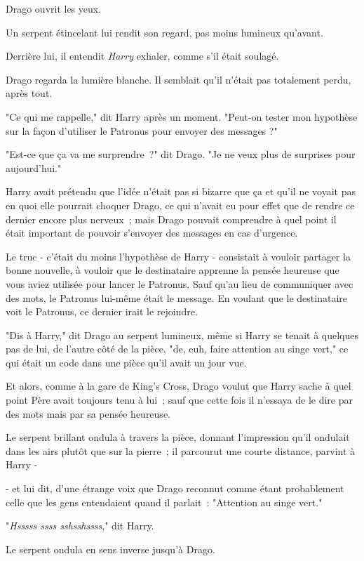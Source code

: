Drago ouvrit les yeux.

Un serpent étincelant lui rendit son regard, pas moins lumineux qu'avant.

Derrière lui, il entendit \emph{Harry} exhaler, comme s'il était soulagé.

Drago regarda la lumière blanche. Il semblait qu'il n'était pas totalement perdu, après tout.

"Ce qui me rappelle," dit Harry après un moment. "Peut-on tester mon hypothèse sur la façon d'utiliser le Patronus pour envoyer des messages ?"

"Est-ce que ça va me surprendre~?" dit Drago. "Je ne veux plus de surprises pour aujourd'hui."

\later

Harry avait prétendu que l'idée n'était pas si bizarre que ça et qu'il ne voyait pas en quoi elle pourrait choquer Drago, ce qui n'avait eu pour effet que de rendre ce dernier encore plus nerveux~; mais Drago pouvait comprendre à quel point il était important de pouvoir s'envoyer des messages en cas d'urgence.

Le truc - c'était du moins l'hypothèse de Harry - consistait à vouloir partager la bonne nouvelle, à vouloir que le destinataire apprenne la pensée heureuse que vous aviez utilisée pour lancer le Patronus. Sauf qu'au lieu de communiquer avec des mots, le Patronus lui-même était le message. En voulant que le destinataire voit le Patronus, ce dernier irait le rejoindre.

"Dis à Harry," dit Drago au serpent lumineux, même si Harry se tenait à quelques pas de lui, de l'autre côté de la pièce, "de, euh, faire attention au singe vert," ce qui était un code dans une pièce qu'il avait un jour vue.

Et alors, comme à la gare de King's Cross, Drago voulut que Harry sache à quel point Père avait toujours tenu à lui~; sauf que cette fois il n'essaya de le dire par des mots mais par sa pensée heureuse.

Le serpent brillant ondula à travers la pièce, donnant l'impression qu'il ondulait dans les airs plutôt que sur la pierre~; il parcourut une courte distance, parvint à Harry -

- et lui dit, d'une étrange voix que Drago reconnut comme étant probablement celle que les gens entendaient quand il parlait~: "Attention au singe vert."

"\emph{Hsssss ssss sshsshssss}," dit Harry.

Le serpent ondula en sens inverse jusqu'à Drago.

